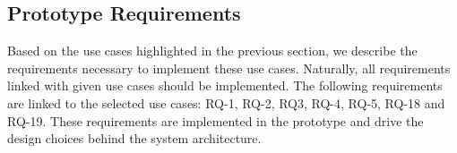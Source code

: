 \subsection{Prototype Requirements} \label{sec:design-prototype-requirements}

Based on the use cases highlighted in the previous section, we describe the requirements necessary to implement these use cases. Naturally, all requirements linked with given use cases should be implemented. The following requirements are linked to the selected use cases: RQ-1, RQ-2, RQ3, RQ-4, RQ-5, RQ-18 and RQ-19. These requirements are implemented in the prototype and drive the design choices behind the system architecture. 


